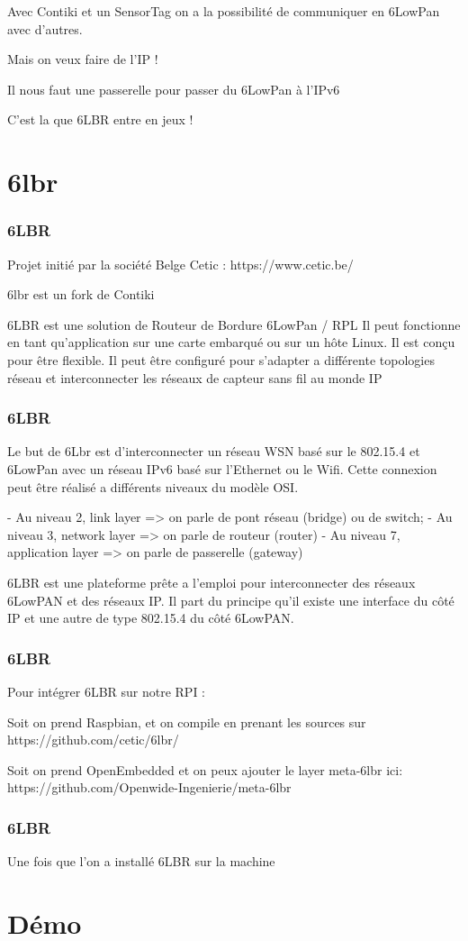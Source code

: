 \documentclass{smilebeamer}
\begin{document}
\begin{frame}

Avec Contiki et un SensorTag on a la possibilité de communiquer en 6LowPan avec d'autres.

Mais on veux faire de l'IP !

Il nous faut une passerelle pour passer du 6LowPan à l'IPv6

C'est la que 6LBR entre en jeux !

\end{frame}

\section{6lbr}

\begin{frame}
\frametitle{6LBR}
Projet initié par la société Belge Cetic :  https://www.cetic.be/

6lbr est un fork de Contiki

6LBR est une solution de Routeur de Bordure 6LowPan / RPL
Il peut fonctionne en tant qu'application sur une carte embarqué ou sur un hôte Linux.
Il est conçu pour être flexible.
Il peut être configuré pour s'adapter a différente topologies réseau et interconnecter les réseaux de capteur sans fil au monde IP
\end{frame}

\begin{frame}
\frametitle{6LBR}

Le but de 6Lbr est d'interconnecter un réseau WSN basé sur le 802.15.4 et 6LowPan avec un réseau IPv6 basé sur l'Ethernet ou le Wifi.
Cette connexion peut être réalisé a différents niveaux du modèle OSI.

- Au niveau 2, link layer            => on parle de pont réseau (bridge) ou de switch;
- Au niveau 3, network layer     => on parle de routeur (router)
- Au niveau 7, application layer => on parle de passerelle (gateway)

6LBR est une plateforme prête a l'emploi pour interconnecter des réseaux 6LowPAN et des réseaux IP. Il part du principe qu'il existe une interface du côté IP et une autre de type 802.15.4 du côté 6LowPAN.
\end{frame}

\begin{frame}
\frametitle{6LBR}

Pour intégrer 6LBR sur notre RPI :

Soit on prend Raspbian, et on compile en prenant les sources sur 
https://github.com/cetic/6lbr/

Soit on prend OpenEmbedded et on peux ajouter le layer meta-6lbr ici:
https://github.com/Openwide-Ingenierie/meta-6lbr

\end{frame}


\begin{frame}
\frametitle{6LBR}

Une fois que l'on a installé 6LBR sur la machine

\end{frame}

\section{Démo}
\end{document}
